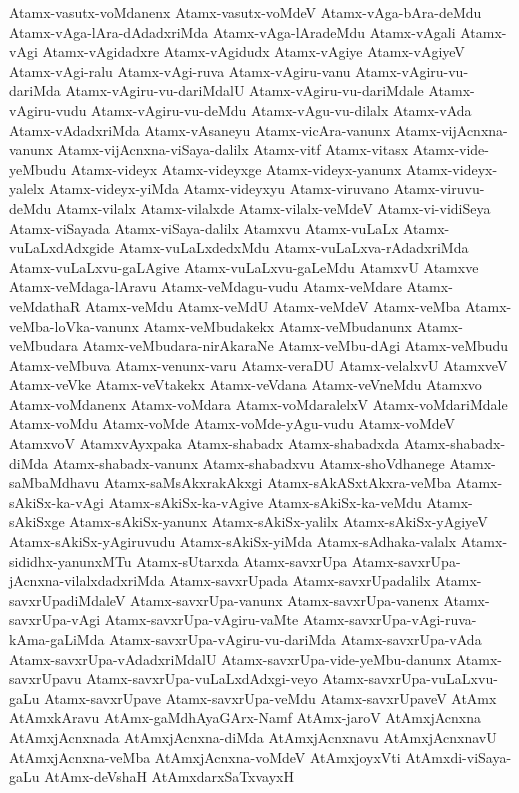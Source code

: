 {Atamx-vasutx-voMdanenx
Atamx-vasutx-voMdeV
Atamx-vAga-bAra-deMdu
Atamx-vAga-lAra-dAdadxriMda
Atamx-vAga-lAradeMdu
Atamx-vAgali
Atamx-vAgi
Atamx-vAgidadxre
Atamx-vAgidudx
Atamx-vAgiye
Atamx-vAgiyeV
Atamx-vAgi-ralu
Atamx-vAgi-ruva
Atamx-vAgiru-vanu
Atamx-vAgiru-vu-dariMda
Atamx-vAgiru-vu-dariMdalU
Atamx-vAgiru-vu-dariMdale
Atamx-vAgiru-vudu
Atamx-vAgiru-vu-deMdu
Atamx-vAgu-vu-dilalx
Atamx-vAda
Atamx-vAdadxriMda
Atamx-vAsaneyu
Atamx-vicAra-vanunx
Atamx-vijAcnxna-vanunx
Atamx-vijAcnxna-viSaya-dalilx
Atamx-vitf
Atamx-vitasx
Atamx-vide-yeMbudu
Atamx-videyx
Atamx-videyxge
Atamx-videyx-yanunx
Atamx-videyx-yalelx
Atamx-videyx-yiMda
Atamx-videyxyu
Atamx-viruvano
Atamx-viruvu-deMdu
Atamx-vilalx
Atamx-vilalxde
Atamx-vilalx-veMdeV
Atamx-vi-vidiSeya
Atamx-viSayada
Atamx-viSaya-dalilx
Atamxvu
Atamx-vuLaLx
Atamx-vuLaLxdAdxgide
Atamx-vuLaLxdedxMdu
Atamx-vuLaLxva-rAdadxriMda
Atamx-vuLaLxvu-gaLAgive
Atamx-vuLaLxvu-gaLeMdu
AtamxvU
Atamxve
Atamx-veMdaga-lAravu
Atamx-veMdagu-vudu
Atamx-veMdare
Atamx-veMdathaR
Atamx-veMdu
Atamx-veMdU
Atamx-veMdeV
Atamx-veMba
Atamx-veMba-loVka-vanunx
Atamx-veMbudakekx
Atamx-veMbudanunx
Atamx-veMbudara
Atamx-veMbudara-nirAkaraNe
Atamx-veMbu-dAgi
Atamx-veMbudu
Atamx-veMbuva
Atamx-venunx-varu
Atamx-veraDU
Atamx-velalxvU
AtamxveV
Atamx-veVke
Atamx-veVtakekx
Atamx-veVdana
Atamx-veVneMdu
Atamxvo
Atamx-voMdanenx
Atamx-voMdara
Atamx-voMdaralelxV
Atamx-voMdariMdale
Atamx-voMdu
Atamx-voMde
Atamx-voMde-yAgu-vudu
Atamx-voMdeV
AtamxvoV
AtamxvAyxpaka
Atamx-shabadx
Atamx-shabadxda
Atamx-shabadx-diMda
Atamx-shabadx-vanunx
Atamx-shabadxvu
Atamx-shoVdhanege
Atamx-saMbaMdhavu
Atamx-saMsAkxrakAkxgi
Atamx-sAkASxtAkxra-veMba
Atamx-sAkiSx-ka-vAgi
Atamx-sAkiSx-ka-vAgive
Atamx-sAkiSx-ka-veMdu
Atamx-sAkiSxge
Atamx-sAkiSx-yanunx
Atamx-sAkiSx-yalilx
Atamx-sAkiSx-yAgiyeV
Atamx-sAkiSx-yAgiruvudu
Atamx-sAkiSx-yiMda
Atamx-sAdhaka-valalx
Atamx-sididhx-yanunxMTu
Atamx-sUtarxda
Atamx-savxrUpa
Atamx-savxrUpa-jAcnxna-vilalxdadxriMda
Atamx-savxrUpada
Atamx-savxrUpadalilx
Atamx-savxrUpadiMdaleV
Atamx-savxrUpa-vanunx
Atamx-savxrUpa-vanenx
Atamx-savxrUpa-vAgi
Atamx-savxrUpa-vAgiru-vaMte
Atamx-savxrUpa-vAgi-ruva-kAma-gaLiMda
Atamx-savxrUpa-vAgiru-vu-dariMda
Atamx-savxrUpa-vAda
Atamx-savxrUpa-vAdadxriMdalU
Atamx-savxrUpa-vide-yeMbu-danunx
Atamx-savxrUpavu
Atamx-savxrUpa-vuLaLxdAdxgi-veyo
Atamx-savxrUpa-vuLaLxvu-gaLu
Atamx-savxrUpave
Atamx-savxrUpa-veMdu
Atamx-savxrUpaveV
AtAmx
AtAmxkAravu
AtAmx-gaMdhAyaGArx-Namf
AtAmx-jaroV
AtAmxjAcnxna
AtAmxjAcnxnada
AtAmxjAcnxna-diMda
AtAmxjAcnxnavu
AtAmxjAcnxnavU
AtAmxjAcnxna-veMba
AtAmxjAcnxna-voMdeV
AtAmxjoyxVti
AtAmxdi-viSaya-gaLu
AtAmx-deVshaH
AtAmxdarxSaTxvayxH
}
